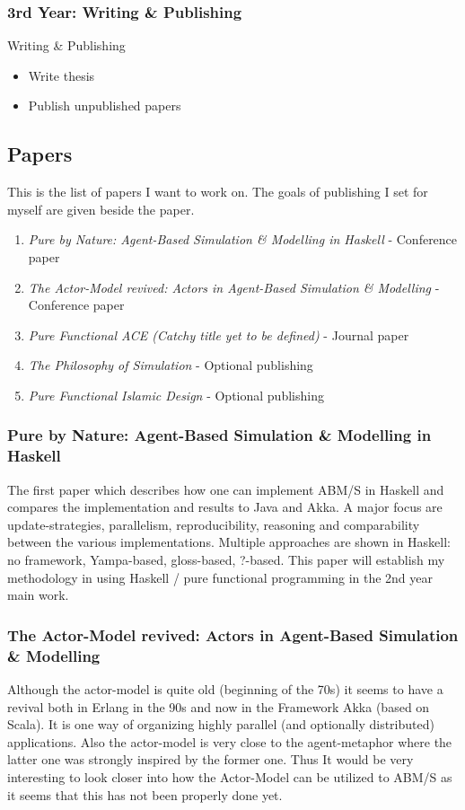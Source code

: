 \subsubsection{3rd Year: Writing \& Publishing}
Writing \& Publishing
\begin{itemize}
\item Write thesis
\item Publish unpublished papers
\end{itemize}

\subsection{Papers}
This is the list of papers I want to work on. The goals of publishing I set for myself are given beside the paper.

\begin{enumerate}
\item \textit{Pure by Nature: Agent-Based Simulation \& Modelling in Haskell} - Conference paper
\item \textit{The Actor-Model revived: Actors in Agent-Based Simulation \& Modelling} - Conference paper
\item \textit{Pure Functional ACE (Catchy title yet to be defined)} - Journal paper
\item \textit{The Philosophy of Simulation} - Optional publishing
\item \textit{Pure Functional Islamic Design} - Optional publishing
\end{enumerate}

\subsubsection{Pure by Nature: Agent-Based Simulation \& Modelling in Haskell}
The first paper which describes how one can implement ABM/S in Haskell and compares the implementation and results to Java and Akka. A major focus are update-strategies, parallelism, reproducibility, reasoning and comparability between the various implementations. Multiple approaches are shown in Haskell: no framework, Yampa-based, gloss-based, ?-based. This paper will establish my methodology in using Haskell / pure functional programming in the 2nd year main work.

\subsubsection{The Actor-Model revived: Actors in Agent-Based Simulation \& Modelling}
Although the actor-model is quite old (beginning of the 70s) it seems to have a revival both in Erlang in the 90s and now in the Framework Akka (based on Scala). It is one way of organizing highly parallel (and optionally distributed) applications. Also the actor-model is very close to the agent-metaphor where the latter one was strongly inspired by the former one. Thus It would be very interesting to look closer into how the Actor-Model can be utilized to ABM/S as it seems that this has not been properly done yet.

